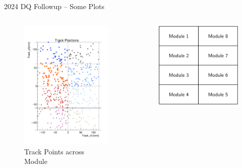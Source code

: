 \begin{frame}{2024 DQ Followup -- Some Plots}
\begin{columns}
    \begin{column}{0.7 \textwidth}
        \begin{figure}
            \centering
            \includegraphics[height=0.7\textheight]{assets/Positions_st0_truemodule0.pdf}
            \caption{Track Points across Module}
        \end{figure}
    \end{column}
    \hspace{-2cm}\begin{column}{0.6 \textwidth}
        \begin{figure}
            \centering
            \includegraphics[height=0.4\textwidth]{assets/ModuleThumbnail.png}

\end{figure}
\end{column}
\end{columns}
\end{frame}
